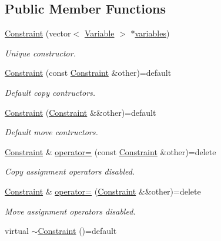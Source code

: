 \subsection*{Public Member Functions}
\begin{DoxyCompactItemize}
\item 
\hyperlink{classghost_1_1Constraint_a2b66b2953a7b3d81e6f215ea4e5e0294}{Constraint} (vector$<$ \hyperlink{classghost_1_1Variable}{Variable} $>$ $\ast$\hyperlink{classghost_1_1Constraint_a1730b1b54d03d221e6e2a95185a2184b}{variables})
\begin{DoxyCompactList}\small\item\em Unique constructor. \end{DoxyCompactList}\item 
\hyperlink{classghost_1_1Constraint_a12f4e85434d02d6fe0a2a95fa7ff6a56}{Constraint} (const \hyperlink{classghost_1_1Constraint}{Constraint} \&other)=default
\begin{DoxyCompactList}\small\item\em Default copy contructors. \end{DoxyCompactList}\item 
\hyperlink{classghost_1_1Constraint_af90f09c362cb7eea3f92ed2814f26f20}{Constraint} (\hyperlink{classghost_1_1Constraint}{Constraint} \&\&other)=default
\begin{DoxyCompactList}\small\item\em Default move contructors. \end{DoxyCompactList}\item 
\hyperlink{classghost_1_1Constraint}{Constraint} \& \hyperlink{classghost_1_1Constraint_a002177e11deecee2db240c9ff4647008}{operator=} (const \hyperlink{classghost_1_1Constraint}{Constraint} \&other)=delete
\begin{DoxyCompactList}\small\item\em Copy assignment operators disabled. \end{DoxyCompactList}\item 
\hyperlink{classghost_1_1Constraint}{Constraint} \& \hyperlink{classghost_1_1Constraint_a2d220b6c65e9c5456bdbc49944a0b52c}{operator=} (\hyperlink{classghost_1_1Constraint}{Constraint} \&\&other)=delete
\begin{DoxyCompactList}\small\item\em Move assignment operators disabled. \end{DoxyCompactList}\item 
virtual \hyperlink{classghost_1_1Constraint_aebea8263c24d0c3a5328c20ee0006f32}{$\sim$\+Constraint} ()=default

\end{DoxyCompactItemize}
